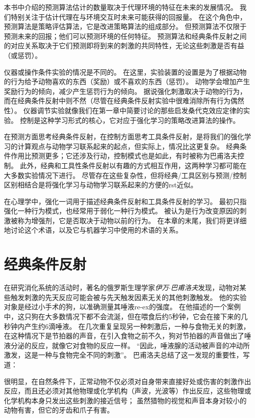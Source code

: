 本书中介绍的预测算法估计的数量取决于代理环境的特征在未来的发展情况。
我们特别关注于估计代理在与环境交互时未来可能获得的回报量。
在这个角色中，预测算法是策略评估算法，它是改进策略算法的组成部分。
但预测算法不仅限于预测未来的回报；他们可以预测环境的任何特征\cite{modayil2014prediction}。
预测算法和经典条件反射之间的对应关系取决于它们预测即将到来的刺激的共同特性，无论这些刺激是否有益（或惩罚）。


仪器或操作条件实验的情况是不同的。
在这里，实验装置的设置是为了根据动物的行为给予动物喜欢的东西（奖励）或不喜欢的东西（惩罚）。
动物学会增加产生奖励行为的倾向，减少产生惩罚行为的倾向。
据说强化刺激取决于动物的行为，而在经典条件反射中则不然（尽管在经典条件反射实验中很难消除所有行为偶然性）。
仪器调节实验就像我们在第一章中简要讨论的那些启发桑代克效应定律的实验。
控制是这种学习形式的核心，它对应于强化学习的策略改进算法的操作。


在预测方面思考经典条件反射，在控制方面思考工具条件反射，是将我们的强化学习的计算观点与动物学习联系起来的起点，但实际上，情况比这更复杂。
经典条件作用比预测更多；它还涉及行动，控制模式也是如此，有时被称为巴甫洛夫控制。
此外，经典和工具性条件反射以有趣的方式相互作用，这两种学习都可能在大多数实验情况下进行。
尽管存在这些复杂性，但将经典/工具区别与预测/控制区别相结合是将强化学习与动物学习联系起来的方便的rst近似。


在心理学中，强化一词用于描述经典条件反射和工具条件反射的学习。
最初只指强化一种行为模式，也经常用于弱化一种行为模式。
被认为是行为改变原因的刺激被称为增强剂，它是否取决于动物以前的行为。
在本章的末尾，我们将更详细地讨论这个术语，以及它与机器学习中使用的术语的关系。


\section{经典条件反射} \label{sec:classical_conditioning}

在研究消化系统的活动时，著名的俄罗斯生理学家\textit{伊万$\cdot$巴甫洛夫}发现，动物对某些触发刺激的先天反应可能会被与先天触发因素无关的其他刺激触发。
他的实验对象是经过小手术的狗，以准确测量其唾液re-ex的强度。
在他描述的一个案例中，这只狗在大多数情况下都不会流涎，但在喂食后约5秒钟，它会在接下来的几秒钟内产生约6滴唾液。
在几次重复呈现另一种刺激后，一种与食物无关的刺激，在这种情况下是节拍器的声音，在引入食物之前不久，狗对节拍器的声音做出了唾液分泌的反应，就像它对食物的反应一样。
“因此，唾液腺的活动被声音的冲动所激发，这是一种与食物完全不同的刺激”。
巴甫洛夫总结了这一发现的重要性，写道：


很明显，在自然条件下，正常动物不仅必须对自身带来直接好处或伤害的刺激作出反应，而且还必须对其他物理或化学机构（声波，光波等）作出反应，这些物理或化学机构本身只发出这些刺激的接近信号；
虽然猎物的视觉和声音本身对较小的动物有害，但它的牙齿和爪子有害。



